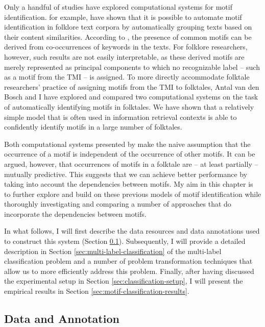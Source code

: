 Only a handful of studies have explored computational systems for motif identification. \citeauthor{voigt:1999} for example, have shown that it is possible to automate motif identification in folklore text corpora by automatically grouping texts based on their content similarities.\autocite{voigt:1999} According to \citeauthor{voigt:1999}, the presence of common motifs can be derived from co-occurrences of keywords in the texts. For folklore researchers, however, such results are not easily interpretable, as these derived motifs are merely represented as principal components to which no recognizable label -- such as a motif from the TMI -- is assigned. To more directly accommodate folktale researchers' practice of assigning motifs from the TMI to folktales, Antal van den Bosch and I have explored and compared two computational systems on the task of automatically identifying motifs in folktales.\autocite{karsdorp:2013} We have shown that a relatively simple model that is often used in information retrieval contexts is able to confidently identify motifs in a large number of folktales. 

Both computational systems presented by \citeauthor{karsdorp:2013} make the naive assumption that the occurrence of a motif is independent of the occurrence of other motifs. It can be argued, however, that occurrences of motifs in a folktale are -- at least partially -- mutually predictive. This suggests that we can achieve better performance by taking into account the dependencies between motifs. My aim in this chapter is to further explore and build on these previous models of motif identification while thoroughly investigating and comparing a number of approaches that do incorporate the dependencies between motifs. 

In what follows, I will first describe the data resources and data annotations used to construct this system (Section \ref{sec:classification-data}). Subsequently, I will provide a detailed description in Section \ref{sec:multi-label-classification} of the multi-label classification problem and a number of problem transformation techniques that allow us to more efficiently address this problem. Finally, after having discussed the experimental setup in Section \ref{sec:classification-setup}, I will present the empirical results in Section \ref{sec:motif-classification-results}.


\subsection{Data and Annotation}\label{sec:classification-data}

